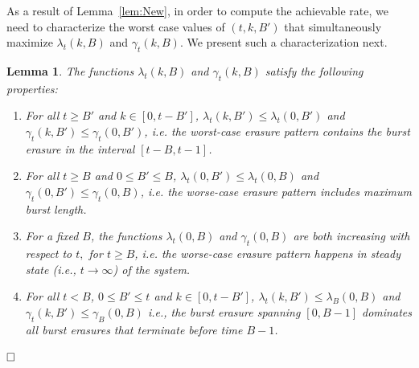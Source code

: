\documentclass[journal, twocolumn, 10pt]{IEEEtran}
\newtheorem{lemma}{Lemma}
\newcommand{\g}{\gamma}
\begin{document}
As a result of Lemma~\ref{lem:New}, in order to compute the achievable rate, we need to characterize the worst case values of  $(t,k,B')$ that simultaneously maximize $\lambda_t(k,B)$ and $\g_t(k,B)$. We present such a characterization next.

\begin{lemma}
\label{lem:3Step}
The functions $\lambda_t(k,B)$ and $\gamma_t(k,B)$ satisfy the following properties: \begin{enumerate}
\item  For all $t\ge B'$ and $k\in[0,t-B']$, $\lambda_t(k,B') \le \lambda_t(0,B')$ and $\gamma_t(k,B') \le \gamma_t(0,B')$, i.e. the worst-case erasure pattern contains the burst erasure in the interval $[t-B, t-1]$. 
\item  For all $t\ge B$ and $0\le B' \le B$, $\lambda_t(0,B') \le \lambda_t(0,B)$ and $\gamma_t(0,B') \le \gamma_t(0,B)$, i.e. the worse-case erasure pattern includes maximum burst length. 
\item  For a fixed $B$, the functions $\lambda_t(0,B)$ and $\gamma_t(0,B)$ are both  increasing with respect to $t,$ for $t\ge B$, i.e. the worse-case erasure pattern happens in steady state (i.e., $t\rightarrow\infty$) of the system.
\item  For all $t<B$, $0\le B' \le t$ and $k\in[0,t-B']$, $\lambda_t(k,B') \le \lambda_B(0,B)$ and $\gamma_t(k,B') \le \gamma_B(0,B)$ i.e., the burst erasure spanning $[0,B-1]$ dominates all burst erasures that terminate before time ${B-1}$.
\end{enumerate}

$\hfill\Box$
\end{lemma}
\end{document}
